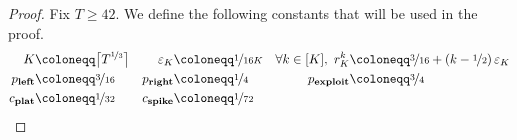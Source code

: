 \documentclass[final,12pt]{colt2025}
\newcommand{\cA}{\mathcal{A}}
\newcommand{\cS}{\mathcal{S}}
\newcommand{\e}{\varepsilon}
\newcommand{\lrb}[1]{\left(#1\right)}
\begin{document}
{
\begin{proof}
\renewcommand{\cA}{\mathscr{A}}
\renewcommand{\cS}{\mathcal{A}}
Fix $T \ge 42$.
We define the following constants that will be used in the proof.
\begin{align*}
    K & \coloneqq \bigl\lceil T^{\nicefrac{1}{3}} \bigr\rceil 
& 
    \e_K & \coloneqq \nicefrac{1}{16 K} 
&
     \forall k\in[K], \ r_{K}^k & \coloneqq \nicefrac{3}{16} + \lrb{k - \nicefrac{1}{2}}\e_K
\\ 
    p_{\textbf{left}} & \coloneqq \nicefrac{3}{16} 
& 
    p_{\textbf{right}} & \coloneqq \nicefrac{1}{4} 
& 
    p_{\textbf{exploit}} & \coloneqq \nicefrac{3}{4}
\\
    c_{\textbf{plat}} & \coloneqq \nicefrac{1}{32}
&
    c_{\textbf{spike}} & \coloneqq \nicefrac{1}{72}
&
\end{align*}


\end{proof}}
\end{document}
